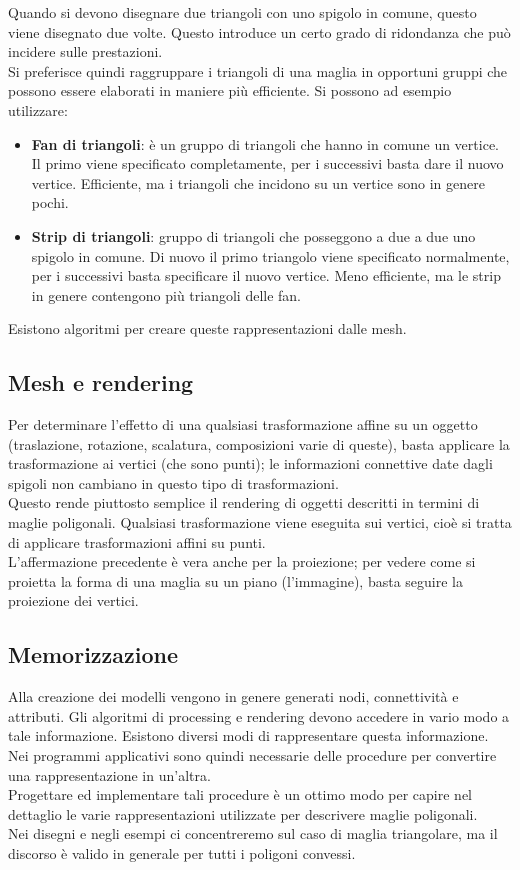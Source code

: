 \documentclass[a4paper, 10pt]{article}
\begin{document}
		Quando si devono disegnare due triangoli con uno spigolo in
		comune, questo viene disegnato due volte. Questo introduce
		un certo grado di ridondanza che può incidere sulle prestazioni.\\
		Si preferisce quindi raggruppare i triangoli di una maglia in
		opportuni gruppi che possono essere elaborati in maniere più
		efficiente. Si possono ad esempio utilizzare:
		\begin{itemize}
			\item \textbf{Fan di triangoli}: è un gruppo di triangoli che hanno in comune un
			vertice. Il primo viene specificato completamente, per i successivi
			basta dare il nuovo vertice. Efficiente, ma i triangoli che incidono su
			un vertice sono in genere pochi.
			\item \textbf{Strip di triangoli}: gruppo di triangoli che posseggono a due a due
			uno spigolo in comune. Di nuovo il primo triangolo viene specificato
			normalmente, per i successivi basta specificare il nuovo vertice.
			Meno efficiente, ma le strip in genere contengono più triangoli delle
			fan.
		\end{itemize}
		Esistono algoritmi per creare queste rappresentazioni dalle
		mesh.
		
	\subsection{Mesh e rendering}
		Per determinare l’effetto di una qualsiasi trasformazione affine
		su un oggetto (traslazione, rotazione, scalatura, composizioni
		varie di queste), basta applicare la trasformazione ai vertici
		(che sono punti); le informazioni connettive date dagli spigoli
		non cambiano in questo tipo di trasformazioni.\\
		Questo rende piuttosto semplice il rendering di oggetti descritti in
		termini di maglie poligonali. Qualsiasi trasformazione viene eseguita
		sui vertici, cioè si tratta di applicare trasformazioni affini su punti.\\
		L’affermazione precedente è vera anche per la proiezione; per vedere
		come si proietta la forma di una maglia su un piano (l’immagine),
		basta seguire la proiezione dei vertici.
		
	\subsection{Memorizzazione}
		Alla creazione dei modelli vengono in genere generati nodi,
		connettività e attributi. Gli algoritmi di processing e rendering
		devono accedere in vario modo a tale informazione.
		Esistono diversi modi di rappresentare questa informazione.\\
		Nei programmi applicativi sono quindi necessarie delle
		procedure per convertire una rappresentazione in un’altra. \\
		Progettare ed implementare tali procedure è un ottimo modo
		per capire nel dettaglio le varie rappresentazioni utilizzate per
		descrivere maglie poligonali.\\
		Nei disegni e negli esempi ci concentreremo sul caso di maglia
		triangolare, ma il discorso è valido in generale per tutti i
		poligoni convessi.
\end{document}
